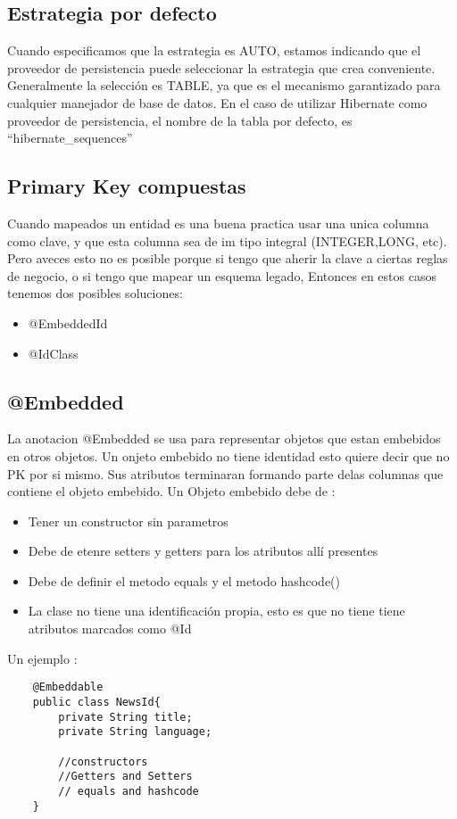 \documentclass{article}
\begin{document}
\subsection*{Estrategia por defecto}
Cuando especificamos que la estrategia es AUTO, estamos indicando que el proveedor de persistencia puede seleccionar la estrategia que
crea conveniente. Generalmente la selección es TABLE, ya que es el mecanismo garantizado para cualquier manejador de base de datos.
En el caso de utilizar Hibernate como proveedor de persistencia, el nombre de la tabla por defecto, es ``hibernate\_sequences''

\subsection*{Primary Key compuestas}

Cuando mapeados un entidad es una buena practica usar una unica columna como clave, y que esta columna sea de im tipo integral (INTEGER,LONG, etc).
Pero aveces esto no es posible porque si tengo que aherir la clave a ciertas reglas de negocio, o si tengo que mapear un esquema legado, Entonces en estos casos
tenemos dos posibles soluciones:
\begin{itemize}
	\item @EmbeddedId
	\item @IdClass
\end{itemize}

\subsection*{@Embedded}

La anotacion @Embedded se usa para representar objetos que estan embebidos en otros objetos. Un onjeto embebido no tiene identidad esto quiere decir que no PK por si mismo.
Sus atributos terminaran formando parte delas columnas que contiene el objeto embebido. Un Objeto embebido debe de :
\begin{itemize}
	\item Tener un constructor sin parametros
	\item Debe de etenre setters y getters para los atributos allí presentes
	\item Debe de definir el metodo equals y el metodo hashcode()
	\item La clase no tiene una identificación propia, esto es que no tiene tiene atributos marcados como @Id
\end{itemize}

Un ejemplo :
\begin{lstlisting}
    @Embeddable
    public class NewsId{
        private String title;
        private String language;
        
        //constructors 
        //Getters and Setters
        // equals and hashcode
    }
\end{lstlisting}
\end{document}
